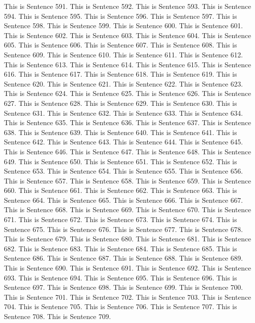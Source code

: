 \documentclass{article}
\begin{document}
This is Sentence 591.
This is Sentence 592.
This is Sentence 593.
This is Sentence 594.
This is Sentence 595.
This is Sentence 596.
This is Sentence 597.
This is Sentence 598.
This is Sentence 599.
This is Sentence 600.
This is Sentence 601.
This is Sentence 602.
This is Sentence 603.
This is Sentence 604.
This is Sentence 605.
This is Sentence 606.
This is Sentence 607.
This is Sentence 608.
This is Sentence 609.
This is Sentence 610.
This is Sentence 611.
This is Sentence 612.
This is Sentence 613.
This is Sentence 614.
This is Sentence 615.
This is Sentence 616.
This is Sentence 617.
This is Sentence 618.
This is Sentence 619.
This is Sentence 620.
This is Sentence 621.
This is Sentence 622.
This is Sentence 623.
This is Sentence 624.
This is Sentence 625.
This is Sentence 626.
This is Sentence 627.
This is Sentence 628.
This is Sentence 629.
This is Sentence 630.
This is Sentence 631.
This is Sentence 632.
This is Sentence 633.
This is Sentence 634.
This is Sentence 635.
This is Sentence 636.
This is Sentence 637.
This is Sentence 638.
This is Sentence 639.
This is Sentence 640.
This is Sentence 641.
This is Sentence 642.
This is Sentence 643.
This is Sentence 644.
This is Sentence 645.
This is Sentence 646.
This is Sentence 647.
This is Sentence 648.
This is Sentence 649.
This is Sentence 650.
This is Sentence 651.
This is Sentence 652.
This is Sentence 653.
This is Sentence 654.
This is Sentence 655.
This is Sentence 656.
This is Sentence 657.
This is Sentence 658.
This is Sentence 659.
This is Sentence 660.
This is Sentence 661.
This is Sentence 662.
This is Sentence 663.
This is Sentence 664.
This is Sentence 665.
This is Sentence 666.
This is Sentence 667.
This is Sentence 668.
This is Sentence 669.
This is Sentence 670.
This is Sentence 671.
This is Sentence 672.
This is Sentence 673.
This is Sentence 674.
This is Sentence 675.
This is Sentence 676.
This is Sentence 677.
This is Sentence 678.
This is Sentence 679.
This is Sentence 680.
This is Sentence 681.
This is Sentence 682.
This is Sentence 683.
This is Sentence 684.
This is Sentence 685.
This is Sentence 686.
This is Sentence 687.
This is Sentence 688.
This is Sentence 689.
This is Sentence 690.
This is Sentence 691.
This is Sentence 692.
This is Sentence 693.
This is Sentence 694.
This is Sentence 695.
This is Sentence 696.
This is Sentence 697.
This is Sentence 698.
This is Sentence 699.
This is Sentence 700.
This is Sentence 701.
This is Sentence 702.
This is Sentence 703.
This is Sentence 704.
This is Sentence 705.
This is Sentence 706.
This is Sentence 707.
This is Sentence 708.
This is Sentence 709.
\end{document}
